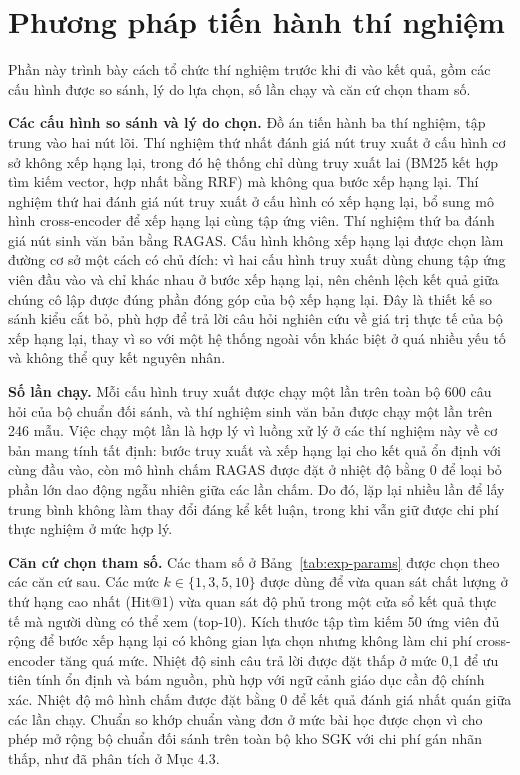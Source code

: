 \documentclass[../DoAn.tex]{subfiles}
\begin{document}
\section{Phương pháp tiến hành thí nghiệm}

Phần này trình bày cách tổ chức thí nghiệm trước khi đi vào kết quả, gồm các cấu hình được so sánh, lý do lựa chọn, số lần chạy và căn cứ chọn tham số.

\textbf{Các cấu hình so sánh và lý do chọn.} Đồ án tiến hành ba thí nghiệm, tập trung vào hai nút lõi. Thí nghiệm thứ nhất đánh giá nút truy xuất ở cấu hình cơ sở không xếp hạng lại, trong đó hệ thống chỉ dùng truy xuất lai (BM25 kết hợp tìm kiếm vector, hợp nhất bằng RRF) mà không qua bước xếp hạng lại. Thí nghiệm thứ hai đánh giá nút truy xuất ở cấu hình có xếp hạng lại, bổ sung mô hình cross-encoder để xếp hạng lại cùng tập ứng viên. Thí nghiệm thứ ba đánh giá nút sinh văn bản bằng RAGAS. Cấu hình không xếp hạng lại được chọn làm đường cơ sở một cách có chủ đích: vì hai cấu hình truy xuất dùng chung tập ứng viên đầu vào và chỉ khác nhau ở bước xếp hạng lại, nên chênh lệch kết quả giữa chúng cô lập được đúng phần đóng góp của bộ xếp hạng lại. Đây là thiết kế so sánh kiểu cắt bỏ, phù hợp để trả lời câu hỏi nghiên cứu về giá trị thực tế của bộ xếp hạng lại, thay vì so với một hệ thống ngoài vốn khác biệt ở quá nhiều yếu tố và không thể quy kết nguyên nhân.

\textbf{Số lần chạy.} Mỗi cấu hình truy xuất được chạy một lần trên toàn bộ 600 câu hỏi của bộ chuẩn đối sánh, và thí nghiệm sinh văn bản được chạy một lần trên 246 mẫu. Việc chạy một lần là hợp lý vì luồng xử lý ở các thí nghiệm này về cơ bản mang tính tất định: bước truy xuất và xếp hạng lại cho kết quả ổn định với cùng đầu vào, còn mô hình chấm RAGAS được đặt ở nhiệt độ bằng 0 để loại bỏ phần lớn dao động ngẫu nhiên giữa các lần chấm. Do đó, lặp lại nhiều lần để lấy trung bình không làm thay đổi đáng kể kết luận, trong khi vẫn giữ được chi phí thực nghiệm ở mức hợp lý.

\textbf{Căn cứ chọn tham số.} Các tham số ở Bảng~\ref{tab:exp-params} được chọn theo các căn cứ sau. Các mức $k \in \{1,3,5,10\}$ được dùng để vừa quan sát chất lượng ở thứ hạng cao nhất (Hit@1) vừa quan sát độ phủ trong một cửa sổ kết quả thực tế mà người dùng có thể xem (top-10). Kích thước tập tìm kiếm 50 ứng viên đủ rộng để bước xếp hạng lại có không gian lựa chọn nhưng không làm chi phí cross-encoder tăng quá mức. Nhiệt độ sinh câu trả lời được đặt thấp ở mức 0,1 để ưu tiên tính ổn định và bám nguồn, phù hợp với ngữ cảnh giáo dục cần độ chính xác. Nhiệt độ mô hình chấm được đặt bằng 0 để kết quả đánh giá nhất quán giữa các lần chạy. Chuẩn so khớp chuẩn vàng đơn ở mức bài học được chọn vì cho phép mở rộng bộ chuẩn đối sánh trên toàn bộ kho SGK với chi phí gán nhãn thấp, như đã phân tích ở Mục 4.3.
\end{document}
